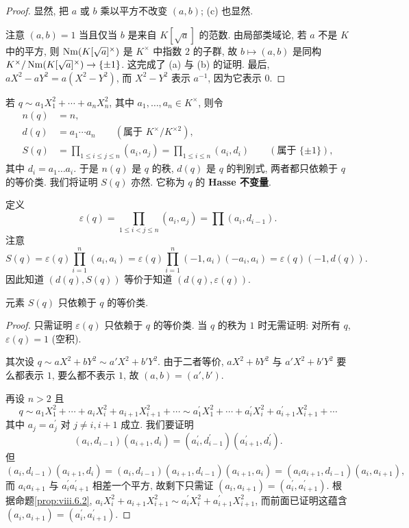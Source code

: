 \begin{proof}
显然, 把 $a$ 或 $b$ 乘以平方不改变 $(a,b)$; (c) 也显然.

注意 $(a,b)=1$ 当且仅当 $b$ 是来自 $K[\sqrt{a}]$ 的范数. 由局部类域论, 若 $a$ 不是 $K$ 中的平方, 则 $\operatorname{Nm}(K[\sqrt{a}]^{\times})$ 是 $K^{\times}$ 中指数 $2$ 的子群, 故 $b\mapsto(a,b)$ 是同构 $K^{\times}/\operatorname{Nm}(K[\sqrt{a}]^{\times})\to\{\pm 1\}$. 这完成了 (a) 与 (b) 的证明. 最后, $aX^{2}-aY^{2}=a(X^{2}-Y^{2})$, 而 $X^{2}-Y^{2}$ 表示 $a^{-1}$, 因为它表示 $0$.
\end{proof}

若 $q\sim a_{1}X_{1}^{2}+\cdots+a_{n}X_{n}^{2}$, 其中 $a_{1},\ldots,a_{n}\in K^{\times}$, 则令
\[
\begin{aligned}
n(q)&=n,\\
d(q)&=a_{1}\cdots a_{n}\qquad(\text{属于 } K^{\times}/K^{\times 2}),\\
S(q)&=\prod_{1\le i\le j\le n}(a_{i},a_{j})=\prod_{1\le i\le n}(a_{i},d_{i})\qquad(\text{属于 } \{\pm 1\}),
\end{aligned}
\]
其中 $d_i=a_1\ldots a_i$. 于是 $n(q)$ 是 $q$ 的秩, $d(q)$ 是 $q$ 的判别式, 两者都只依赖于 $q$ 的等价类. 我们将证明 $S(q)$ 亦然. 它称为 $q$ 的 \textbf{Hasse 不变量}.

\begin{remark}\label{rem:viii.6.6}
\cite{Serre1970} 定义
\[
\varepsilon(q)=\prod_{1\le i<j\le n}(a_{i},a_{j})=\prod(a_{i},d_{i-1}).
\]
注意
\[
S(q)=\varepsilon(q)\prod_{i=1}^{n}(a_{i},a_{i})=\varepsilon(q)\prod_{i=1}^{n}(-1,a_{i})(-a_{i},a_{i})=\varepsilon(q)(-1,d(q)).
\]
因此知道 $(d(q),S(q))$ 等价于知道 $(d(q),\varepsilon(q))$.
\end{remark}

\begin{proposition}\label{prop:viii.6.7}
元素 $S(q)$ 只依赖于 $q$ 的等价类.
\end{proposition}

\begin{proof}
只需证明 $\varepsilon(q)$ 只依赖于 $q$ 的等价类. 当 $q$ 的秩为 $1$ 时无需证明: 对所有 $q$, $\varepsilon(q)=1$ (空积).

其次设 $q\sim aX^{2}+bY^{2}\sim a'X^{2}+b'Y^{2}$. 由于二者等价, $aX^{2}+bY^{2}$ 与 $a'X^{2}+b'Y^{2}$ 要么都表示 $1$, 要么都不表示 $1$, 故 $(a,b)=(a',b')$.

再设 $n>2$ 且
\[
q\sim a_{1}X_{1}^{2}+\cdots+a_{i}X_{i}^{2}+a_{i+1}X_{i+1}^{2}+\cdots\sim a_{1}^{\prime}X_{1}^{2}+\cdots+a_{i}^{\prime}X_{i}^{2}+a_{i+1}^{\prime}X_{i+1}^{2}+\cdots
\]
其中 $a_{j}=a_{j}^{\prime}$ 对 $j\ne i,i+1$ 成立. 我们要证明
\[
(a_{i},d_{i-1})(a_{i+1},d_{i})=(a_{i}^{\prime},d_{i-1}^{\prime})(a_{i+1}^{\prime},d_{i}^{\prime}).
\]
但
\[
(a_{i},d_{i-1})(a_{i+1},d_{i})=(a_{i},d_{i-1})(a_{i+1},d_{i-1})(a_{i+1},a_{i})=(a_{i}a_{i+1},d_{i-1})(a_{i},a_{i+1}),
\]
而 $a_{i}a_{i+1}$ 与 $a_{i}^{\prime}a_{i+1}^{\prime}$ 相差一个平方, 故剩下只需证 $(a_{i},a_{i+1})=(a_{i}^{\prime},a_{i+1}^{\prime})$. 根据命题\ref{prop:viii.6.2}, $a_{i}X_{i}^{2}+a_{i+1}X_{i+1}^{2}\sim a_{i}^{\prime}X_{i}^{2}+a_{i+1}^{\prime}X_{i+1}^{2}$, 而前面已证明这蕴含 $(a_{i},a_{i+1})=(a_{i}^{\prime},a_{i+1}^{\prime})$.
\end{proof}

